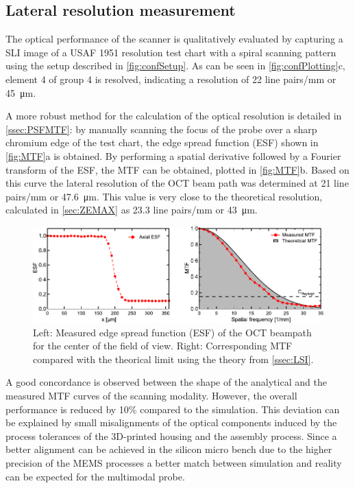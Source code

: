 \subsection{Lateral resolution measurement}
The optical performance of the scanner is qualitatively evaluated by capturing a SLI image of a USAF 1951 resolution test chart with a spiral scanning pattern using the setup described in \autoref{fig:confSetup}. As can be seen in \autoref{fig:confPlotting}c, element 4 of group 4 is resolved, indicating a resolution of 22 line pairs/mm or \SI{45}{\micro\meter}. 

A more robust method for the calculation of the optical resolution is detailed in \autoref{ssec:PSFMTF}: by manually scanning the focus of the probe over a sharp chromium edge of the test chart, the edge spread function (ESF) shown in \autoref{fig:MTF}a is obtained. By performing a spatial derivative followed by a Fourier transform of the ESF, the MTF can be obtained, plotted in \autoref{fig:MTF}b. Based on this curve the lateral resolution of the OCT beam path was determined at 21 line pairs/mm or \SI{47.6}{\micro\meter}. This value is very close to the theoretical resolution, calculated in \autoref{sec:ZEMAX} as 23.3 line pairs/mm or \SI{43}{\micro\meter}.
\begin{figure}[h!]\centering \includegraphics{figures/50_Measurements/conf/res/confResMeas.pdf}
      \caption{Left: Measured edge spread function (ESF) of the OCT beampath for the center of the field of view. 
      Right: Corresponding MTF compared with the theorical limit using the theory from \autoref{ssec:LSI}.}
      \label{fig:MTF}
\end{figure}
A good concordance is observed between the shape of the analytical and the measured MTF curves of the scanning modality. However, the overall performance is reduced by 10\% compared to the simulation. This deviation can be explained by small misalignments of the optical components induced by the process tolerances of the 3D-printed housing and the assembly process. Since a better alignment can be achieved in the silicon micro bench due to the higher precision of the MEMS processes a better match between simulation and reality can be expected for the multimodal probe.

